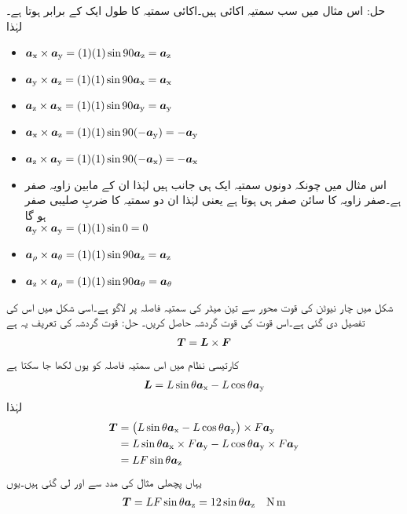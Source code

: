 حل: اس مثال میں سب سمتیہ اکائی ہیں۔اکائی سمتیہ کا طول ایک کے برابر ہوتا ہے۔ لہٰذا
\begin{itemize}
\item
$\ax \times \ay=(1)(1) \sin 90 \az =\az$\\
\item
$\ay \times \az=(1)(1) \sin 90 \ax =\ax$\\
\item
$\az \times \ax=(1)(1) \sin 90 \ay =\ay$\\
\item
$\ax \times \az=(1)(1) \sin 90 (-\ay) =-\ay$\\
\item
$\az \times \ay=(1)(1) \sin 90 (-\ax) =-\ax$\\
\item
اس مثال میں چونکہ دونوں سمتیہ ایک ہی جانب ہیں لہٰذا ان کے مابین زاویہ صفر ہے۔صفر زاویہ کا سائن صفر ہی ہوتا ہے یعنی  لہٰذا ان دو سمتیہ کا ضربِ صلیبی صفر ہو گا\\
$\ay \times \ay=(1)(1) \sin 0  =0$\\
\item
$\arho \times \atheta=(1)(1) \sin 90  \az =\az$\\
\item
$\az \times \arho=(1)(1) \sin 90 \atheta =\atheta $\\
\end{itemize}
%
شکل  میں  چار نیوٹن کی قوت  محور سے تین میٹر کی سمتیہ فاصلہ   پر لاگو ہے۔اسی شکل میں اس کی تفصیل دی گئی ہے۔اس قوت کی قوت گردشہ  حاصل کریں۔
	حل:
	قوت گردشہ  کی تعریف یہ ہے
\begin{align}
\kvec{T}=\kvec{L} \times \kvec{F}
\end{align}
کارتیسی نظام میں اس سمتیہ فاصلہ کو یوں لکھا جا سکتا ہے
\begin{align}
\kvec{L}=L \sin \theta \ax-L \cos \theta \ay
\end{align}
لہٰذا
\begin{align*}
\kvec{T}&=\left(L \sin \theta \ax-L \cos \theta \ay \right) \times F \ay\\
&=L \sin \theta \ax \times F \ay-L \cos \theta \ay \times F \ay\\
&= L F \sin \theta \az
\end{align*} 
یہاں پچھلی مثال کی مدد سے  اور  لی گئی ہیں۔یوں
\begin{align*}
\kvec{T}= L F \sin \theta \az=12 \sin \theta \az \quad \si{\newton \meter}
\end{align*}
